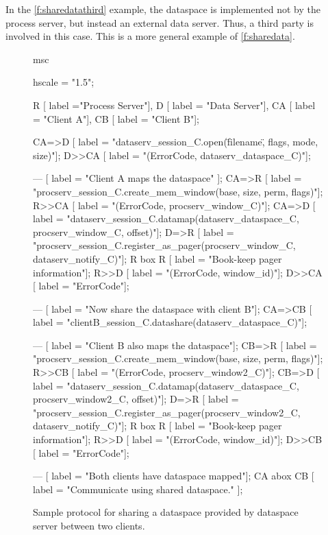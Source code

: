 \clearpage

In the \autoref{f:sharedatathird} example, the dataspace is implemented not by the process server,
but instead an external data server. Thus, a third party is involved in this case. This is a more
general example of \autoref{f:sharedata}.

\begin{figure}[h]
  \begin{center}
    \begin{msc}
      msc {
        hscale = "1.5";

        R [ label ="Process Server"],
        D [ label = "Data Server"],
        CA [ label = "Client A"],
        CB [ label = "Client B"];
        
        CA=>D [ label = "dataserv\_session\_C.open(\"filename\", flags, mode, size)"];
        D>>CA [ label = "(ErrorCode, dataserv\_dataspace\_C)"];

        --- [ label = "Client A maps the dataspace" ];
        CA=>R [ label = "procserv\_session\_C.create\_mem\_window(base, size, perm, flags)"];
        R>>CA [ label = "(ErrorCode, procserv\_window\_C)"];
        CA=>D [ label = "dataserv\_session\_C.datamap(dataserv\_dataspace\_C, procserv\_window\_C, offset)"];
        D=>R [ label = "procserv\_session\_C.register\_as\_pager(procserv\_window\_C, dataserv\_notify\_C)"];
        R box R [ label = "Book-keep pager information"];
        R>>D [ label = "(ErrorCode, window\_id)"];
        D>>CA [ label = "ErrorCode"];

        --- [ label = "Now share the dataspace with client B"];
        CA=>CB [ label = "clientB\_session\_C.datashare(dataserv\_dataspace\_C)"];

        --- [ label = "Client B also maps the dataspace"];
        CB=>R [ label = "procserv\_session\_C.create\_mem\_window(base, size, perm, flags)"];
        R>>CB [ label = "(ErrorCode, procserv\_window2\_C)"];
        CB=>D [ label = "dataserv\_session\_C.datamap(dataserv\_dataspace\_C, procserv\_window2\_C, offset)"];
        D=>R [ label = "procserv\_session\_C.register\_as\_pager(procserv\_window2\_C, dataserv\_notify\_C)"];
        R box R [ label = "Book-keep pager information"];
        R>>D [ label = "(ErrorCode, window\_id)"];
        D>>CB [ label = "ErrorCode"];

        --- [ label = "Both clients have dataspace mapped"];
        CA abox CB [ label = "Communicate using shared dataspace." ];
      }
    \end{msc}
  \end{center}
  \caption{Sample protocol for sharing a dataspace provided by
    dataspace server between two clients.}
  \label{f:sharedatathird}
\end{figure}

